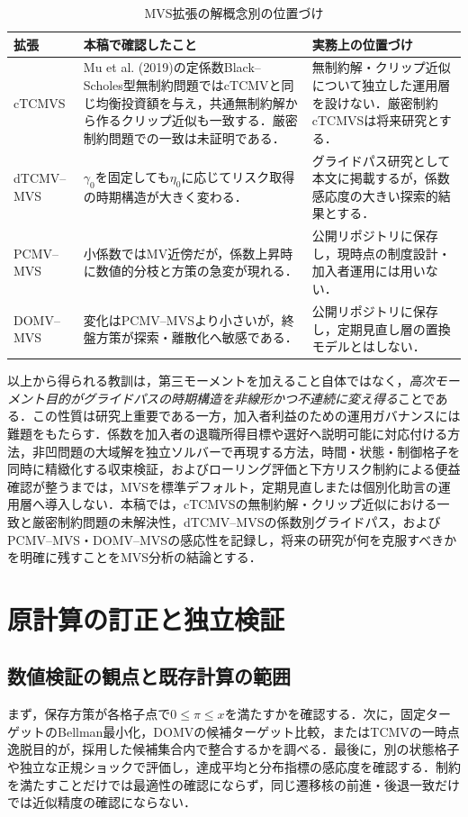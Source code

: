 \documentclass[10pt,a4paper]{article}
\theoremstyle{plain}
\theoremstyle{definition}
\begin{document}
\begin{table}[htbp]
\centering\small
\caption{MVS拡張の解概念別の位置づけ}
\label{tab:mvs-positioning}
\begin{tabularx}{\textwidth}{p{25mm}p{48mm}X}
\toprule
拡張 & 本稿で確認したこと & 実務上の位置づけ \\
\midrule
cTCMVS
& Mu et al. (2019)の定係数Black--Scholes型無制約問題ではcTCMVと同じ均衡投資額を与え，共通無制約解から作るクリップ近似も一致する．厳密制約問題での一致は未証明である．
& 無制約解・クリップ近似について独立した運用層を設けない．厳密制約cTCMVSは将来研究とする．\\
dTCMV--MVS
& $\gamma_0$を固定しても$\eta_0$に応じてリスク取得の時期構造が大きく変わる．
& グライドパス研究として本文に掲載するが，係数感応度の大きい探索的結果とする．\\
PCMV--MVS
& 小係数ではMV近傍だが，係数上昇時に数値的分枝と方策の急変が現れる．
& 公開リポジトリに保存し，現時点の制度設計・加入者運用には用いない．\\
DOMV--MVS
& 変化はPCMV--MVSより小さいが，終盤方策が探索・離散化へ敏感である．
& 公開リポジトリに保存し，定期見直し層の置換モデルとはしない．\\
\bottomrule
\end{tabularx}
\end{table}

以上から得られる教訓は，第三モーメントを加えること自体ではなく，\emph{高次モーメント目的がグライドパスの時期構造を非線形かつ不連続に変え得る}ことである．この性質は研究上重要である一方，加入者利益のための運用ガバナンスには難題をもたらす．係数を加入者の退職所得目標や選好へ説明可能に対応付ける方法，非凹問題の大域解を独立ソルバーで再現する方法，時間・状態・制御格子を同時に精緻化する収束検証，およびローリング評価と下方リスク制約による便益確認が整うまでは，MVSを標準デフォルト，定期見直しまたは個別化助言の運用層へ導入しない．本稿では，cTCMVSの無制約解・クリップ近似における一致と厳密制約問題の未解決性，dTCMV--MVSの係数別グライドパス，およびPCMV--MVS・DOMV--MVSの感応性を記録し，将来の研究が何を克服すべきかを明確に残すことをMVS分析の結論とする．

\section{原計算の訂正と独立検証}\label{app:corrections}
\subsection{数値検証の観点と既存計算の範囲}
まず，保存方策が各格子点で$0\leq\pi\leq x$を満たすかを確認する．次に，固定ターゲットのBellman最小化，DOMVの候補ターゲット比較，またはTCMVの一時点逸脱目的が，採用した候補集合内で整合するかを調べる．最後に，別の状態格子や独立な正規ショックで評価し，達成平均と分布指標の感応度を確認する．制約を満たすことだけでは最適性の確認にならず，同じ遷移核の前進・後退一致だけでは近似精度の確認にならない．
\end{document}
